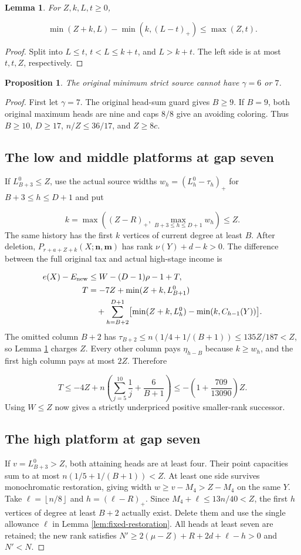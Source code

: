 \documentclass[11pt,a4paper]{article}
\newcommand{\nn}{\mathbf n}\newcommand{\mm}{\mathbf m}
\newcommand{\floor}[1]{\left\lfloor#1\right\rfloor}
\newtheorem{proposition}[theorem]{Proposition}
\newtheorem{lemma}[theorem]{Lemma}
\theoremstyle{definition}
\begin{document}
\begin{lemma}\label{lem:clip}
For $Z,k,L,t\ge0$,

\[
\min(Z+k,L)-\min(k,(L-t)_+)\le\max(Z,t).
\]
\end{lemma}
\begin{proof}
Split into $L\le t$, $t<L\le k+t$, and $L>k+t$.
The left side is at most $t,t,Z$, respectively.
\end{proof}
\begin{proposition}\label{prop:gaps67}
The original minimum strict source cannot have $\gamma=6$ or $7$.
\end{proposition}
\begin{proof}
First let $\gamma=7$. The original head-sum guard gives $B\ge9$.
If $B=9$, both original maximum heads are nine and caps $8/8$ give an avoiding coloring.
Thus $B\ge10$, $D\ge17$, $n/Z\le36/17$, and $Z\ge8c$.

\subsection*{The low and middle platforms at gap seven}
If $L_{B+3}^0\le Z$, use the actual source widths
$w_h=(L_h^0-\tau_h)_+$ for $B+3\le h\le D+1$ and put

\[
k=\max\left((Z-R)_+,\max_{B+3\le h\le D+1}w_h\right)\le Z.
\]
The same history has the first $k$ vertices of current degree at least $B$.
After deletion, $P_{r+a+Z+k}(X;\nn,\mm)$ has rank $\nu(Y)+d-k>0$.
The difference between the full original tax and actual high-stage income is

\[
\begin{split}
e(X)-E_{\rm new}&\le W-(D-1)\rho-1+T,\\
T&=-7Z+\min(Z+k,L_{B+1}^0)\\
&\quad+\sum_{h=B+2}^{D+1}
\bigl[\min(Z+k,L_h^0)-\min(k,C_{h-1}(Y))\bigr].
\end{split}
\]
The omitted column $B+2$ has
$\tau_{B+2}\le n(1/4+1/(B+1))\le135Z/187<Z$,
so Lemma \ref{lem:clip} charges $Z$.
Every other column pays $\eta_{h-B}$ because $k\ge w_h$,
and the first high column pays at most $2Z$. Therefore

\[
T\le-4Z+n\left(\sum_{j=5}^{10}\frac1j+\frac6{B+1}\right)
\le-\left(1+\frac{709}{13090}\right)Z.
\]
Using $W\le Z$ now gives a strictly underpriced positive smaller-rank successor.

\subsection*{The high platform at gap seven}
If $v=L_{B+3}^0>Z$, both attaining heads are at least four.
Their point capacities sum to at most $n(1/5+1/(B+1))<Z$.
At least one side survives monochromatic restoration, giving width
$w\ge v-M_4>Z-M_4$ on the same $Y$.
Take $\ell=\floor{n/8}$ and $h=(\ell-R)_+$.
Since $M_4+\ell\le13n/40<Z$, the first $h$ vertices of degree at least $B+2$
actually exist. Delete them and use the single allowance $\ell$
in Lemma \ref{lem:fixed-restoration}.
All heads at least seven are retained; the new rank satisfies
$N'\ge2(\mu-Z)+R+2d+\ell-h>0$ and $N'<N$.


\end{proof}
\end{document}
